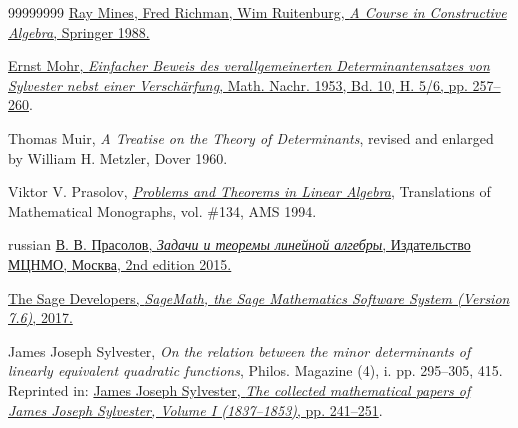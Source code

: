 \documentclass[numbers=enddot,12pt,final,onecolumn,notitlepage]{scrartcl}%
\theoremstyle{definition}
\begin{document}
\begin{thebibliography}{99999999}
%
\href{https://doi.org/10.1007/978-1-4419-8640-5}{Ray Mines, Fred Richman, Wim
Ruitenburg, \textit{A Course in Constructive Algebra}, Springer 1988.}

\href{https://doi.org/10.1002/mana.19530100502}{Ernst
Mohr, \textit{Einfacher Beweis des verallgemeinerten Determinantensatzes von
Sylvester nebst einer Versch\"{a}rfung}, Math. Nachr. 1953, Bd. 10, H. 5/6,
pp. 257--260}.

Thomas Muir, \textit{A Treatise on the Theory of
Determinants}, revised and enlarged by William H. Metzler, Dover 1960.

Viktor V. Prasolov,
\textit{\href{https://staff.math.su.se/mleites/books/prasolov-1994-problems.pdf}{\textit{Problems
and Theorems in Linear Algebra}}}, Translations of Mathematical Monographs,
vol. \#134, AMS 1994.

\begin{otherlanguage*}{russian}
\href{https://sites.google.com/site/prasolovskacatmoiknigi/home}%
{В. В. Прасолов,
\textit{Задачи и теоремы линейной алгебры},
Издательство МЦНМО,
Москва, 2nd edition 2015.}
\end{otherlanguage*}


\href{http://www.sagemath.org}{The Sage
Developers, \textit{SageMath, the Sage Mathematics Software System (Version
7.6)}, 2017.}

James Joseph Sylvester, \textit{On the relation
between the minor determinants of linearly equivalent quadratic functions},
Philos. Magazine (4), i. pp. 295--305, 415. Reprinted in:
\href{https://archive.org/details/collectedmathem01sylvrich}{James Joseph
Sylvester, \textit{The collected mathematical papers of James Joseph
Sylvester, Volume I (1837--1853)}, pp. 241--251}.
\end{thebibliography}
\end{document}
